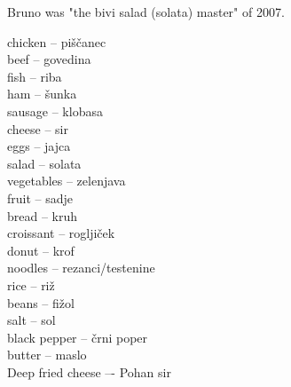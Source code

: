 \begin{marginfigure}
\checkoddpage \ifoddpage \forcerectofloat \else \forceversofloat \fi
\centering
 \caption{Bruno was "the bivi salad (solata) master" of 2007. }
 \label{solata}
\end{marginfigure}

chicken -- piščanec\\
beef -- govedina\\
fish -- riba\\
ham -- šunka\\
sausage -- klobasa\\
cheese -- sir\\
eggs -- jajca\\
salad -- solata\\
vegetables -- zelenjava\\
fruit -- sadje\\
bread -- kruh\\
croissant -- rogljiček\\
donut -- krof\\
noodles -- rezanci/testenine\\
rice -- riž\\
beans -- fižol\\
salt -- sol\\
black pepper -- črni poper\\
butter -- maslo\\
Deep fried cheese –- Pohan sir\\

